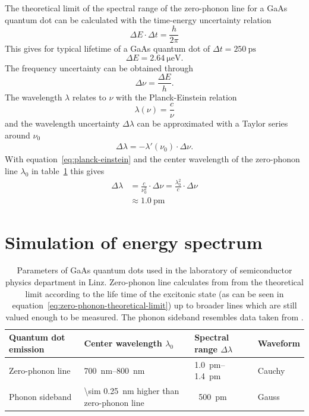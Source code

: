 The theoretical limit of the spectral range of the zero-phonon line for a GaAs quantum dot can be calculated with the time-energy uncertainty relation
\begin{equation}
\Delta E \cdot \Delta t = \frac{h}{2 \pi}
\end{equation}
This gives for typical lifetime of a GaAs quantum dot of $\Delta t = \SI{250}{\pico \second}$
\begin{equation}
\Delta E = \SI{2.64}{\micro \electronvolt}.
\end{equation}
The frequency uncertainty can be obtained through
\begin{equation}
\label{eq:planck-einstein}
\Delta \nu = \frac{\Delta E}{h}.
\end{equation}
The wavelength $\lambda$ relates to $\nu$ with the Planck-Einstein relation 
\begin{equation}
\lambda(\nu) = \frac{c}{\nu}
\end{equation}
and the wavelength uncertainty $\Delta \lambda$ can be approximated with a Taylor series around $\nu_0$
\begin{align}
\Delta \lambda = - \lambda'(\nu_0)\cdot \Delta \nu.
\end{align}
With equation~\eqref{eq:planck-einstein} and the center wavelength of the zero-phonon line $\lambda_{0}$ in table~\ref{tab:quantum-dot-emission} this gives
\begin{align}
\Delta \lambda &= \frac{c}{\nu_0^2} \cdot \Delta \nu = \frac{\lambda_0^2}{c}\cdot\Delta \nu\\
\label{eq:zero-phonon-theoretical-limit}
&\approx \SI{1.0}{\pico \metre}
\end{align}

\section{Simulation of energy spectrum}

\begin{table}[H]
	\caption[Paramters of GaAs quantum dots used in the laboratory of semiconductor physics department in Linz.]{Parameters of GaAs quantum dots used in the laboratory of semiconductor physics department in Linz.
	Zero-phonon line calculates from from the theoretical limit according to the life time of the excitonic state (as can be seen in equation~\eqref{eq:zero-phonon-theoretical-limit}) up to broader lines which are still valued enough to be measured.
	The phonon sideband resembles data taken from \textcite{scholl_resonance_2019}.}
	\label{tab:quantum-dot-emission}
	\begin{tabular}{@{}llll@{}}
		\toprule
		Quantum dot emission & Center wavelength $\lambda_0$           & Spectral range $\Delta \lambda$ & Waveform                  \\ \midrule
		Zero-phonon line               & \SIrange{700}{800}{\nano \metre} & \SIrange{1.0}{1.4}{\pico \metre} & Cauchy\\
		Phonon sideband       & \SI{\sim 0.25}{\nano \metre} higher than zero-phonon line  & ~\SI{500}{\pico \metre} & Gauss  \\ \bottomrule
	\end{tabular}
\end{table}

